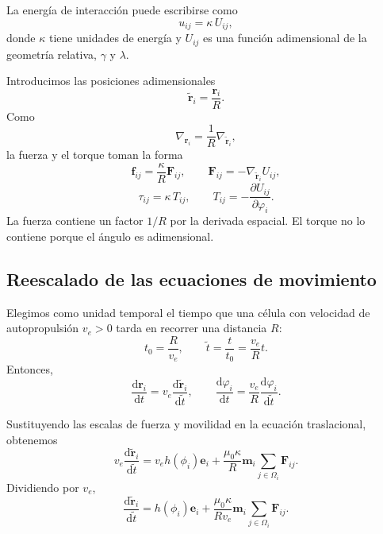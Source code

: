 \documentclass[11pt,a4paper]{article}
\begin{document}
La energía de interacción puede escribirse como
\begin{equation}
	u_{ij}=\kappa\,U_{ij},
\end{equation}
donde $\kappa$ tiene unidades de energía y $U_{ij}$ es una función adimensional de la geometría relativa, $\gamma$ y $\lambda$.

Introducimos las posiciones adimensionales
\begin{equation}
	\widetilde{\bm r}_i=\frac{\bm r_i}{R}.
\end{equation}
Como
\begin{equation}
	\nabla_{\bm r_i}
	=
	\frac{1}{R}\nabla_{\widetilde{\bm r}_i},
\end{equation}
la fuerza y el torque toman la forma
\begin{equation}
	\bm f_{ij}
	=
	\frac{\kappa}{R}\bm F_{ij},
	\qquad
	\bm F_{ij}
	=
	-\nabla_{\widetilde{\bm r}_i}U_{ij},
\end{equation}
\begin{equation}
	\tau_{ij}=\kappa\,T_{ij},
	\qquad
	T_{ij}=-\frac{\partial U_{ij}}{\partial\varphi_i}.
\end{equation}
La fuerza contiene un factor $1/R$ por la derivada espacial.
El torque no lo contiene porque el ángulo es adimensional.

\subsection{Reescalado de las ecuaciones de movimiento}

Elegimos como unidad temporal el tiempo que una célula
con velocidad de autopropulsión $v_e>0$ tarda en recorrer
una distancia $R$:
\begin{equation}
	t_0=\frac{R}{v_e},
	\qquad
	\widetilde t=\frac{t}{t_0}=\frac{v_e}{R}t.
\end{equation}
Entonces,
\begin{equation}
	\frac{\mathrm{d}\bm r_i}{\mathrm{d}t}
	=
	v_e
	\frac{\mathrm{d}\widetilde{\bm r}_i}
	{\mathrm{d}\widetilde t},
	\qquad
	\frac{\mathrm{d}\varphi_i}{\mathrm{d}t}
	=
	\frac{v_e}{R}
	\frac{\mathrm{d}\varphi_i}{\mathrm{d}\widetilde t}.
\end{equation}

Sustituyendo las escalas de fuerza y movilidad en
la ecuación traslacional, obtenemos
\begin{equation}
	v_e
	\frac{\mathrm{d}\widetilde{\bm r}_i}
	{\mathrm{d}\widetilde t}
	=
	v_e h(\phi_i)\bm e_i
	+
	\frac{\mu_0 \kappa}{R}
	\bm m_i
	\sum_{j\in\Omega_i}\bm F_{ij}.
\end{equation}
Dividiendo por $v_e$,
\begin{equation}
	\frac{\mathrm{d}\widetilde{\bm r}_i}
	{\mathrm{d}\widetilde t}
	=
	h(\phi_i)\bm e_i
	+
	\frac{\mu_0 \kappa}{Rv_e}
	\bm m_i
	\sum_{j\in\Omega_i}\bm F_{ij}.
	\label{eq:scaled_translation}
\end{equation}
\end{document}
